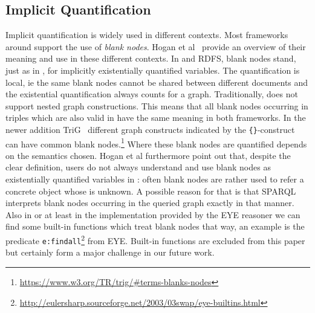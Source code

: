 

\subsection{Implicit Quantification}\label{iq}
Implicit quantification is widely used in different contexts. Most frameworks around \rdf support the use of \emph{blank nodes}. 
Hogan et al~\cite{blanks} provide an overview of their meaning and use in these different contexts. In \rdf and RDFS, blank nodes stand, just as in \nthree, for
implicitly existentially quantified variables. The quantification is local, ie the same blank nodes cannot be shared between different documents and the existential quantification 
always counts for a graph. Traditionally, \rdf does not support nested graph constructions. This means that all blank nodes occurring
in \nthree triples which  are also valid in \rdf have the same meaning in both frameworks.
In the newer addition TriG~\cite{TriG} different graph constructs indicated by the \texttt{\{\}}-construct can have common blank nodes.\footnote{\url{https://www.w3.org/TR/trig/\#terms-blanks-nodes}}
Where these blank nodes are quantified depends on the semantics chosen.
Hogan et al furthermore point out that, despite the clear definition, users do not always understand and use blank nodes as existentially quantified variables in \rdf: 
often blank nodes are rather used to refer a concrete object whose \iri is unknown. %
A possible reason 
for that is that SPARQL~\cite{SPARQL} interprets blank nodes occurring in the queried \rdf graph exactly in that manner. Also in \nthree or at least in the \nthree implementation provided by the 
EYE reasoner we can find some built-in functions which treat blank nodes that way, an example is the predicate 
\texttt{e:findall}\footnote{\url{http://eulersharp.sourceforge.net/2003/03swap/eye-builtins.html}} from EYE.
Built-in functions are excluded from this paper but certainly form a major challenge in our future work. 

